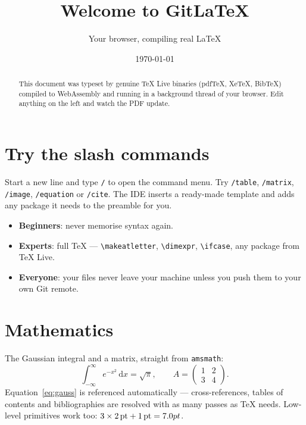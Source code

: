 \documentclass[11pt]{article}
\title{Welcome to \textbf{GitLaTeX}}
\author{Your browser, compiling real \LaTeX{}}
\date{\today}
\begin{document}
\maketitle

\begin{abstract}
This document was typeset by genuine \TeX{} Live binaries (pdf\TeX, Xe\TeX,
Bib\TeX) compiled to WebAssembly and running in a background thread of your
browser. Edit anything on the left and watch the PDF update.
\end{abstract}

\section{Try the slash commands}\label{sec:slash}
Start a new line and type \texttt{/} to open the command menu. Try
\texttt{/table}, \texttt{/matrix}, \texttt{/image}, \texttt{/equation} or
\texttt{/cite}. The IDE inserts a ready-made template and adds any package it
needs to the preamble for you.

\begin{itemize}[leftmargin=2.4em, label=\textcolor{MidnightBlue}{$\blacktriangleright$}]
  \item \textbf{Beginners}: never memorise syntax again.
  \item \textbf{Experts}: full \TeX{} --- \verb|\makeatletter|, \verb|\dimexpr|,
        \verb|\ifcase|, any package from \TeX{} Live.
  \item \textbf{Everyone}: your files never leave your machine unless you push
        them to your own Git remote.
\end{itemize}

\section{Mathematics}
The Gaussian integral and a matrix, straight from \texttt{amsmath}:
\begin{equation}\label{eq:gauss}
  \int_{-\infty}^{\infty} e^{-x^2}\,\mathrm{d}x = \sqrt{\pi},
  \qquad
  A = \begin{pmatrix} 1 & 2 \\ 3 & 4 \end{pmatrix}.
\end{equation}
Equation~\eqref{eq:gauss} is referenced automatically --- cross-references,
tables of contents and bibliographies are resolved with as many passes as
\TeX{} needs. Low-level primitives work too: $3\times 2\,\text{pt} + 1\,\text{pt}
= \the\dimexpr 3\dimexpr 2pt\relax + 1pt\relax$.
\end{document}
